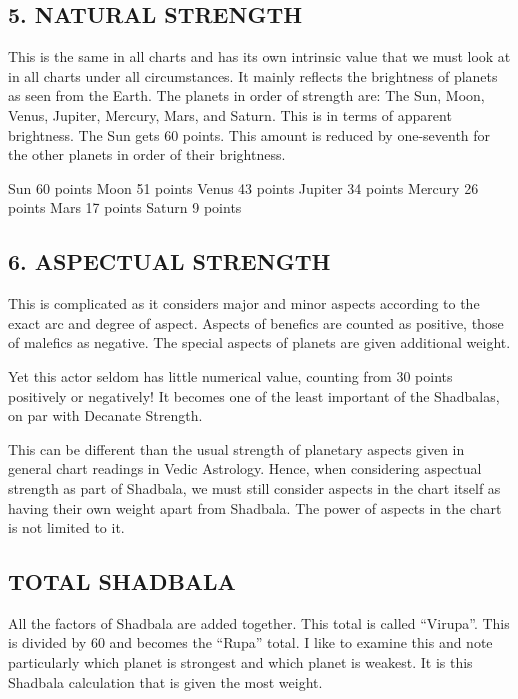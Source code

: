  


\subsection{5. NATURAL STRENGTH}
 

This is the same in all charts and has its own intrinsic value that we must look at in all charts under all circumstances. It mainly reflects the brightness of planets as seen from the Earth. The planets in order of strength are: The Sun, Moon, Venus, Jupiter, Mercury, Mars, and Saturn. This is in terms of apparent brightness. The Sun gets 60 points. This amount is reduced by one-seventh for the other planets in order of their brightness.

 

Sun	60 points	Moon	51 points
Venus	43 points	Jupiter	34 points
Mercury	26 points	Mars	17 points
Saturn	9 points		
 

\subsection{6. ASPECTUAL STRENGTH}
 

This is complicated as it considers major and minor aspects according to the exact arc and degree of aspect. Aspects of benefics are counted as positive, those of malefics as negative. The special aspects of planets are given additional weight.

 

Yet this actor seldom has little numerical value, counting from 30 points positively or negatively! It becomes one of the least important of the Shadbalas, on par with Decanate Strength.

 

This can be different than the usual strength of planetary aspects given in general chart readings in Vedic Astrology. Hence, when considering aspectual strength as part of Shadbala, we must still consider aspects in the chart itself as having their own weight apart from Shadbala. The power of aspects in the chart is not limited to it.

 

 

\subsection{TOTAL SHADBALA}

 

All the factors of Shadbala are added together. This total is called “Virupa”. This is divided by 60 and becomes the “Rupa” total. I like to examine this and note particularly which planet is strongest and which planet is weakest. It is this Shadbala calculation that is given the most weight.

